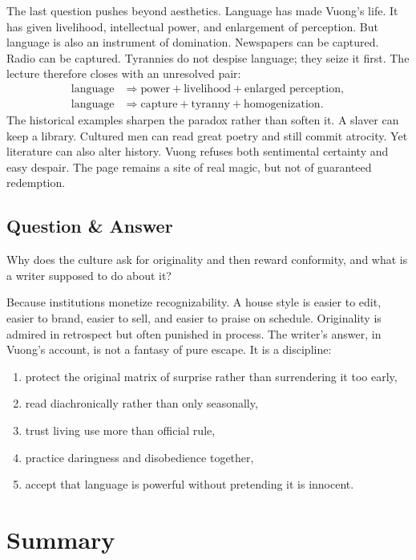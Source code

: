 The last question pushes beyond aesthetics. Language has made Vuong's life. It has given livelihood, intellectual power, and enlargement of perception. But language is also an instrument of domination. Newspapers can be captured. Radio can be captured. Tyrannies do not despise language; they seize it first. The lecture therefore closes with an unresolved pair:
\begin{align}
\text{language} &\Longrightarrow \text{power} + \text{livelihood} + \text{enlarged perception},\\
\text{language} &\Longrightarrow \text{capture} + \text{tyranny} + \text{homogenization}.
\end{align}
The historical examples sharpen the paradox rather than soften it. A slaver can keep a library. Cultured men can read great poetry and still commit atrocity. Yet literature can also alter history. Vuong refuses both sentimental certainty and easy despair. The page remains a site of real magic, but not of guaranteed redemption.

\subsection{Question \& Answer}

Why does the culture ask for originality and then reward conformity, and what is a writer supposed to do about it?

Because institutions monetize recognizability. A house style is easier to edit, easier to brand, easier to sell, and easier to praise on schedule. Originality is admired in retrospect but often punished in process. The writer's answer, in Vuong's account, is not a fantasy of pure escape. It is a discipline:
\begin{enumerate}
\item protect the original matrix of surprise rather than surrendering it too early,
\item read diachronically rather than only seasonally,
\item trust living use more than official rule,
\item practice daringness and disobedience together,
\item accept that language is powerful without pretending it is innocent.
\end{enumerate}

\section{Summary}

